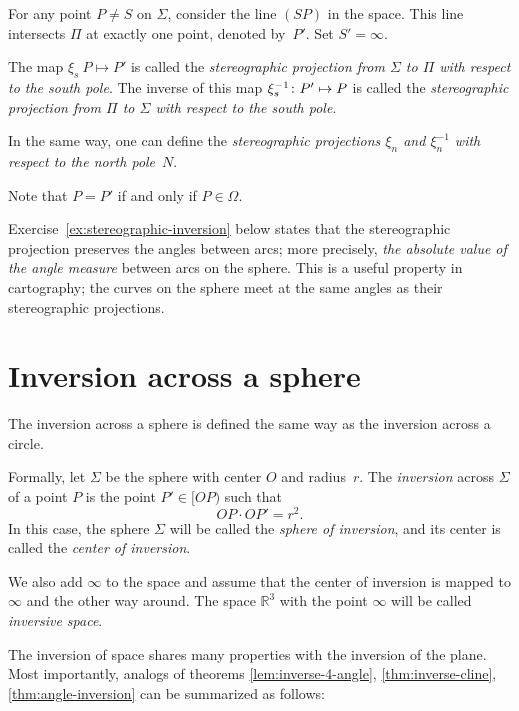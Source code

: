 For any point $P\ne S$ on $\Sigma$,
consider the line $(SP)$ in the space. 
This line intersects $\Pi$ at exactly one point, denoted by~$P'$. 
Set $S'=\infty$.


The map $\xi_s\: P\mapsto P'$ is called the \emph{stereographic projection from $\Sigma$ to $\Pi$ with respect to the south pole}.
The inverse of this map $\xi^{-1}_s\colon P'\mapsto P$ is called the {}\emph{stereographic projection from $\Pi$ to $\Sigma$ with respect to the south pole}.

In the same way, one can define the
{}\emph{stereographic projections $\xi_n$ and $\xi^{-1}_n$ with respect to the north pole}~$N$.

Note that $P=P'$ if and only if $P\in\Omega$.

Exercise~\ref{ex:stereographic-inversion} below states that the stereographic projection preserves 
the angles between arcs;
more precisely, \textit{the absolute value of the angle measure} between arcs on the sphere.
This is a useful property in cartography;
the curves on the sphere meet at the same angles as their stereographic projections.


\section[Inversion]{Inversion across a sphere}

The inversion across a sphere is defined the same way as the inversion across a circle.

Formally, let $\Sigma$ be the sphere with center $O$ and radius~$r$.
The \emph{inversion} across $\Sigma$ of a point $P$ is the point $P'\in[OP)$ such that
$$OP\cdot OP'=r^2.$$
In this case, the sphere $\Sigma$  will be called the 
\emph{sphere of inversion},
and its center is called the \emph{center of inversion}.

We also add $\infty$ to the space and assume that the center of inversion is mapped to $\infty$ and the other way around. 
The space $\mathbb{R}^3$ with the point $\infty$ will be called \emph{inversive space}.

The inversion of space shares many properties with the inversion of the plane.
Most importantly, analogs of theorems \ref{lem:inverse-4-angle}, \ref{thm:inverse-cline}, \ref{thm:angle-inversion} can be summarized as follows:

